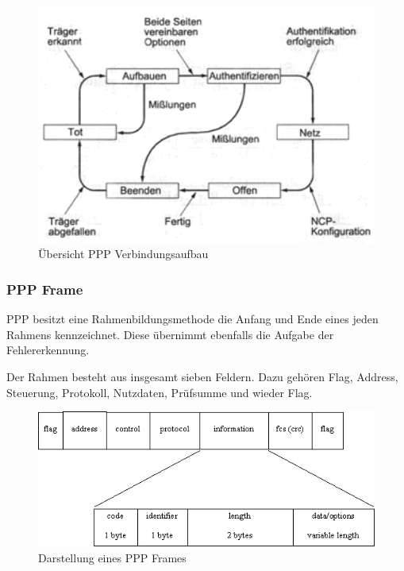 \documentclass[12pt, a4paper, ngerman]{article}
\begin{document}
\begin{figure}[H]
	\centering
	\includegraphics[width=1\textwidth]{Grafiken/ppp.jpg}	
	\caption{Übersicht PPP Verbindungsaufbau \cite{SWB-307875709}}
	\label{aufbau_ppp-verbindung}
\end{figure}



\subsubsection{PPP Frame}

PPP besitzt eine Rahmenbildungsmethode die Anfang und Ende eines jeden Rahmens kennzeichnet. Diese übernimmt ebenfalls die Aufgabe der Fehlererkennung.

Der Rahmen besteht aus insgesamt sieben Feldern. Dazu gehören Flag, Address, Steuerung,  Protokoll, Nutzdaten, Prüfsumme und wieder Flag.

\begin{figure}[H]
	\centering
	\includegraphics[width=1\textwidth]{Grafiken/ppp-frame.jpg}	
	\caption{Darstellung eines PPP Frames \cite{ppp-lcp-info.header}}
	\label{ppp_frame}
\end{figure}
\end{document}
